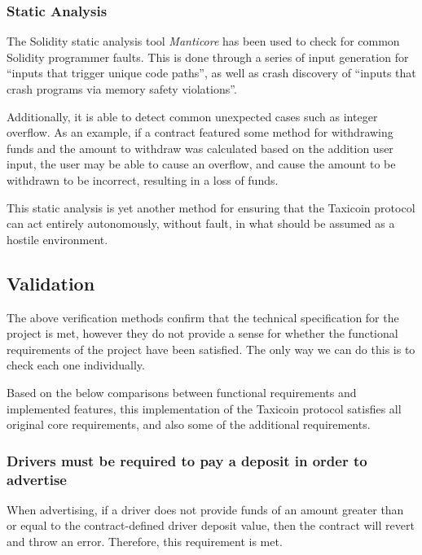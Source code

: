 \subsubsection{Static Analysis}


The Solidity static analysis tool \textit{Manticore} has been used to check for common Solidity programmer faults. This is done through a series of input generation for \enquote{inputs that trigger unique code paths}, as well as crash discovery of \enquote{inputs that crash programs via memory safety violations}.

Additionally, it is able to detect common unexpected cases such as integer overflow. As an example, if a contract featured some method for withdrawing funds and the amount to withdraw was calculated based on the addition user input, the user may be able to cause an overflow, and cause the amount to be withdrawn to be incorrect, resulting in a loss of funds.

This static analysis is yet another method for ensuring that the Taxicoin protocol can act entirely autonomously, without fault, in what should be assumed as a hostile environment.

\subsection{Validation}


The above verification methods confirm that the technical specification for the project is met, however they do not provide a sense for whether the functional requirements of the project have been satisfied. The only way we can do this is to check each one individually.

Based on the below comparisons between functional requirements and implemented features, this implementation of the Taxicoin protocol satisfies all original core requirements, and also some of the additional requirements.

\subsubsection*{Drivers must be required to pay a deposit in order to advertise}

When advertising, if a driver does not provide funds of an amount greater than or equal to the contract-defined driver deposit value, then the contract will revert and throw an error. Therefore, this requirement is met.


